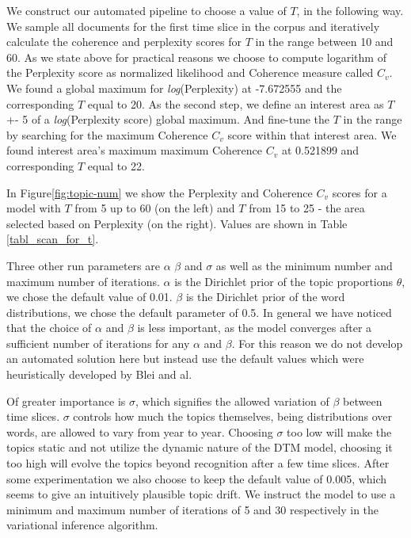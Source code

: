 \documentclass[12pt,journal,letterpaper,oneside,onecolumn]{IEEEtran}
\begin{document}
We construct our automated pipeline to choose a value of $T$, in the following way. We sample all documents for the first time slice in the corpus and iteratively calculate the coherence and perplexity scores for $T$ in the range between 10 and 60. As we state above for practical reasons we choose to compute logarithm of the Perplexity score as normalized likelihood and Coherence measure called $C_v$. We found a global maximum for \textit{log}(Perplexity) at -7.672555 and the corresponding $T$ equal to 20. As the second step, we define an interest area as $T$ +- 5 of a \textit{log}(Perplexity score) global maximum. And fine-tune the $T$ in the range by searching for the maximum Coherence $C_v$ score within that interest area. We found interest area's maximum maximum Coherence $C_v$ at 0.521899 and corresponding $T$ equal to 22.

In Figure\ref{fig:topic-num} we show the Perplexity and Coherence $C_v$ scores for a model with $T$ from 5 up to 60 (on the left) and $T$ from 15 to 25 - the area selected based on Perplexity (on the right). Values are shown in Table \ref{tabl_scan_for_t}.

Three other run parameters are $\alpha$ $\beta$ and $\sigma$  as well as the minimum number and maximum number of iterations. 
$\alpha $ is the Dirichlet prior of the topic proportions $\theta$, we chose the default value of 0.01. $\beta$ is the Dirichlet prior of the word distributions, we chose the default parameter of 0.5.
In general we have noticed that the choice of $\alpha$ and $\beta$ is less important, as the model converges after a sufficient number of iterations for any $\alpha$ and $\beta$. For this reason we do not develop an automated solution here but instead use the default values which were heuristically developed by Blei and al.

Of greater importance is $\sigma$, which signifies the allowed variation of $\beta$ between time slices. $\sigma$ controls how much the topics themselves, being distributions over words, are allowed to vary from year to year.
Choosing $\sigma$ too low will make the topics static and not utilize the dynamic nature of the DTM model, choosing it too high will evolve the topics beyond recognition after a few time slices.
After some experimentation we also choose to keep the default value of 0.005, which seems to give an intuitively plausible topic drift. 
We instruct the model to use a minimum and maximum number of iterations of 5 and 30 respectively in the variational inference algorithm.
\end{document}
